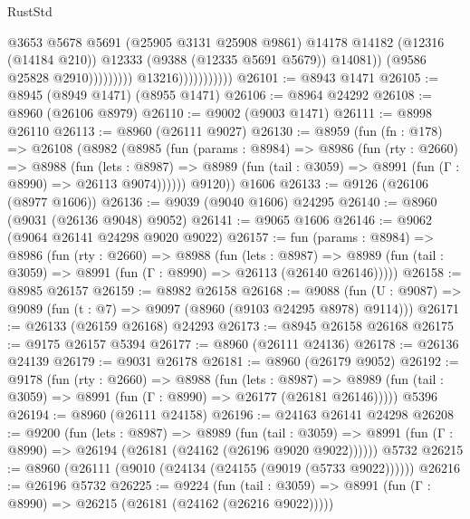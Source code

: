 \begin{lexlean}{RustStd}
\begin{coremodule}
                                              @3653
                                              @5678
                                              @5691
                                              (@25905 @3131 @25908 @9861)
                                              @14178
                                              @14182
                                              (@12316 (@14184 @210))
                                              @12333
                                              (@9388 (@12335 @5691 @5679))
                                              @14081))
                                          (@9586 @25828 @2910)))))))))
                          @13216)))))))))))
@26101 := @8943 @1471
@26105 := @8945 (@8949 @1471) (@8955 @1471)
@26106 := @8964 @24292
@26108 := @8960 (@26106 @8979)
@26110 := @9002 (@9003 @1471)
@26111 := @8998 @26110
@26113 := @8960 (@26111 @9027)
@26130 := @8959
    (fun (fn : @178) =>
    @26108
      (@8982
        (@8985
          (fun (params : @8984) =>
          @8986
            (fun (rty : @2660) =>
            @8988
              (fun (lets : @8987) =>
              @8989 (fun (tail : @3059) => @8991 (fun (Γ : @8990) => @26113 @9074))))))
        @9120))
    @1606
@26133 := @9126 (@26106 (@8977 @1606))
@26136 := @9039 (@9040 @1606) @24295
@26140 := @8960 (@9031 (@26136 @9048) @9052)
@26141 := @9065 @1606
@26146 := @9062 (@9064 @26141 @24298 @9020 @9022)
@26157 := fun (params : @8984) =>
  @8986
    (fun (rty : @2660) =>
    @8988
      (fun (lets : @8987) =>
      @8989 (fun (tail : @3059) => @8991 (fun (Γ : @8990) => @26113 (@26140 @26146)))))
@26158 := @8985 @26157
@26159 := @8982 @26158
@26168 := @9088
    (fun (U : @9087) => @9089 (fun (t : @7) => @9097 (@8960 (@9103 @24295 @8978) @9114)))
@26171 := @26133 (@26159 @26168) @24293
@26173 := @8945 @26158 @26168
@26175 := @9175 @26157 @5394
@26177 := @8960 (@26111 @24136)
@26178 := @26136 @24139
@26179 := @9031 @26178
@26181 := @8960 (@26179 @9052)
@26192 := @9178
    (fun (rty : @2660) =>
    @8988
      (fun (lets : @8987) =>
      @8989 (fun (tail : @3059) => @8991 (fun (Γ : @8990) => @26177 (@26181 @26146)))))
    @5396
@26194 := @8960 (@26111 @24158)
@26196 := @24163 @26141 @24298
@26208 := @9200
    (fun (lets : @8987) =>
    @8989
      (fun (tail : @3059) =>
      @8991 (fun (Γ : @8990) => @26194 (@26181 (@24162 (@26196 @9020 @9022))))))
    @5732
@26215 := @8960 (@26111 (@9010 (@24134 (@24155 (@9019 (@5733 @9022))))))
@26216 := @26196 @5732
@26225 := @9224
    (fun (tail : @3059) => @8991 (fun (Γ : @8990) => @26215 (@26181 (@24162 (@26216 @9022)))))

\end{coremodule}
\end{lexlean}
